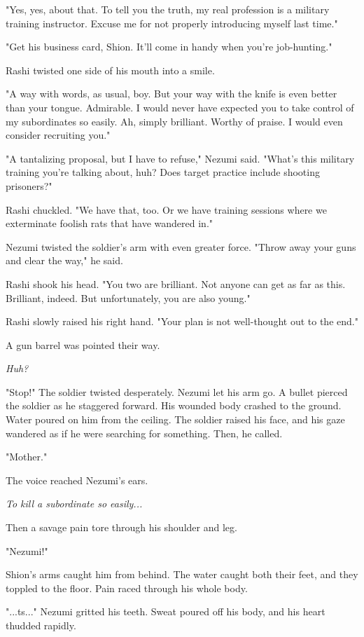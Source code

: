 "Yes, yes, about that. To tell you the truth, my real profession is a
military training instructor. Excuse me for not properly introducing
myself last time."

"Get his business card, Shion. It'll come in handy when you're
job-hunting."

Rashi twisted one side of his mouth into a smile.

"A way with words, as usual, boy. But your way with the knife is even
better than your tongue. Admirable. I would never have expected you to
take control of my subordinates so easily. Ah, simply brilliant. Worthy
of praise. I would even consider recruiting you."

"A tantalizing proposal, but I have to refuse," Nezumi said. "What's
this military training you're talking about, huh? Does target practice
include shooting prisoners?"

Rashi chuckled. "We have that, too. Or we have training sessions where
we exterminate foolish rats that have wandered in."

Nezumi twisted the soldier's arm with even greater force. "Throw away
your guns and clear the way," he said.

Rashi shook his head. "You two are brilliant. Not anyone can get as far
as this. Brilliant, indeed. But unfortunately, you are also young."

Rashi slowly raised his right hand. "Your plan is not well-thought out
to the end."

A gun barrel was pointed their way.

\emph{Huh?}

"Stop!" The soldier twisted desperately. Nezumi let his arm go. A bullet
pierced the soldier as he staggered forward. His wounded body crashed to
the ground. Water poured on him from the ceiling. The soldier raised his
face, and his gaze wandered as if he were searching for something. Then,
he called.

"Mother."

The voice reached Nezumi's ears.

\emph{To kill a subordinate so easily...}

Then a savage pain tore through his shoulder and leg.

"Nezumi!"

Shion's arms caught him from behind. The water caught both their feet,
and they toppled to the floor. Pain raced through his whole body.

"...ts..." Nezumi gritted his teeth. Sweat poured off his body, and his
heart thudded rapidly.

